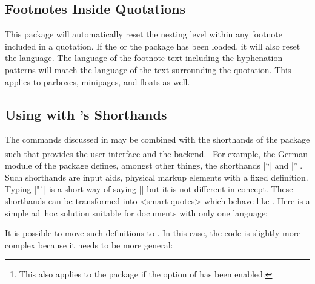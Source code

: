 \documentclass{ltxdockit}[2010/09/26]
\begin{document}
\subsection{Footnotes Inside Quotations}
\label{hnt:ftn}

This package will automatically reset the nesting level within any footnote included in a quotation. If the  or the  package has been loaded, it will also reset the language. The language of the footnote text including the hyphenation patterns will match the language of the text surrounding the quotation. This applies to parboxes, minipages, and floats as well.

\subsection{Using  with 's Shorthands}
\label{hnt:bbl}

The commands discussed in  may be combined with the shorthands of the  package such that  provides the user interface and  the backend.\footnote{This also applies to the  package if the  option of  has been enabled.} For example, the German module of the  package defines, amongst other things, the shorthands |"`| and |"'|. Such shorthands are input aids, \ie physical markup elements with a fixed definition. Typing |"`| is a short way of saying |\quotedblbase| but it is not different in concept. These shorthands can be transformed into <smart quotes> which behave like . Here is a simple ad~hoc solution suitable for documents with only one language:

%
It is possible to move such definitions to . In this case, the code is slightly more complex because it needs to be more general:
\end{document}
